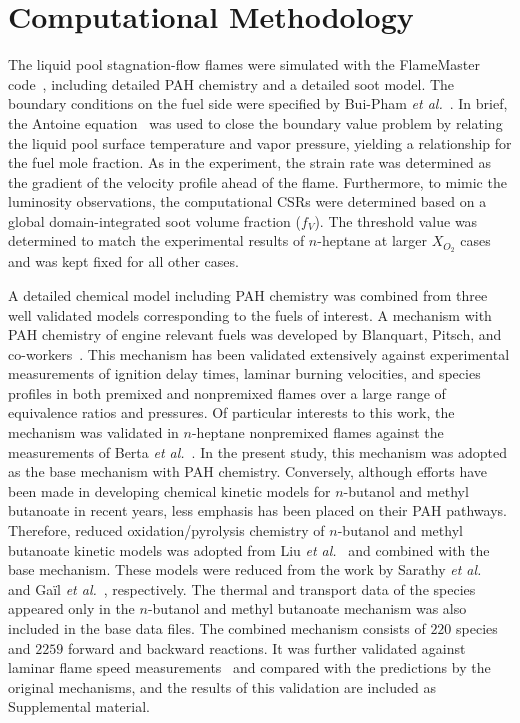\documentclass[review,3p,times]{elsarticleUS}
\begin{document}
\section{Computational Methodology}

The liquid pool stagnation-flow flames were simulated with the FlameMaster code~\cite{flamemaster}, including detailed PAH chemistry and a detailed soot model. The boundary conditions on the fuel side were specified by Bui-Pham \emph{et al.}~\cite{buipham91}. In brief, the Antoine equation~\cite{polingbook} was used to close the boundary value problem by relating the liquid pool surface temperature and vapor pressure, yielding a relationship for the fuel mole fraction. As in the experiment, the strain rate was determined as the gradient of the velocity profile ahead of the flame. Furthermore, to mimic the luminosity observations, the computational CSRs were determined based on a global domain-integrated soot volume fraction ($f_V$). The threshold value was determined to match the experimental results of $n$-heptane at larger $X_{O_2}$ cases and was kept fixed for all other cases.

A detailed chemical model including PAH chemistry was combined from three well validated models corresponding to the fuels of interest. A mechanism with PAH chemistry of engine relevant fuels was developed by Blanquart, Pitsch, and co-workers~\cite{blanquart09b,narayanaswamy10}. This mechanism has been validated extensively against experimental measurements of ignition delay times, laminar burning velocities, and species profiles in both premixed and nonpremixed flames over a large range of equivalence ratios and pressures. Of particular interests to this work, the mechanism was validated in $n$-heptane nonpremixed flames against the measurements of Berta \emph{et al.}~\cite{berta06}. In the present study, this mechanism was adopted as the base mechanism with PAH chemistry. Conversely, although efforts have been made in developing chemical kinetic models for $n$-butanol and methyl butanoate in recent years, less emphasis has been placed on their PAH pathways. Therefore, reduced oxidation/pyrolysis chemistry of $n$-butanol and methyl butanoate kinetic models was adopted from Liu \emph{et al.}~\cite{liu11} and combined with the base mechanism. These models were reduced from the work by Sarathy \emph{et al.}~\cite{sarathy09} and Ga\"il \emph{et al.}~\cite{gail08}, respectively. The thermal and transport data of the species appeared only in the $n$-butanol and methyl butanoate mechanism was also included in the base data files. The combined mechanism consists of $220$ species and $2259$ forward and backward reactions. It was further validated against laminar flame speed measurements~\cite{liu11} and compared with the predictions by the original mechanisms, and the results of this validation are included as Supplemental material.
\end{document}

